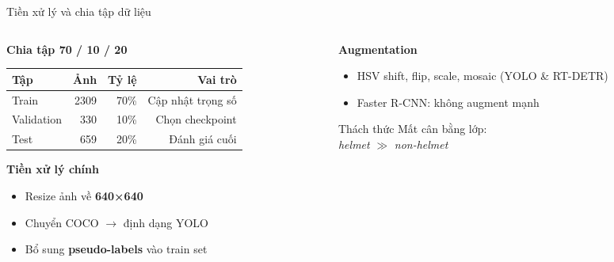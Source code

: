 \begin{frame}{Tiền xử lý và chia tập dữ liệu}

\begin{columns}[T]
\begin{column}{0.55\textwidth}
  \textbf{Chia tập 70 / 10 / 20}

  \vspace{0.3em}
  \begin{table}
  \scriptsize
  \begin{tabular}{lrrr}
    \toprule
    \textbf{Tập} & \textbf{Ảnh} & \textbf{Tỷ lệ} & \textbf{Vai trò} \\
    \midrule
    Train      & 2309 & 70\% & Cập nhật trọng số \\
    Validation & 330  & 10\% & Chọn checkpoint  \\
    Test       & 659  & 20\% & Đánh giá cuối    \\
    \bottomrule
  \end{tabular}
  \end{table}

  \vspace{0.4em}
  \textbf{Tiền xử lý chính}
  \begin{itemize}
    \item Resize ảnh về \textbf{640×640}
    \item Chuyển COCO $\to$ định dạng YOLO
    \item Bổ sung \textbf{pseudo-labels} vào train set
  \end{itemize}
\end{column}
\begin{column}{0.42\textwidth}
  \textbf{Augmentation}
  \begin{itemize}
    \item HSV shift, flip, scale, mosaic (YOLO \& RT-DETR)
    \item Faster R-CNN: không augment mạnh
  \end{itemize}
  \vspace{0.4em}
  \begin{alertblock}{Thách thức}
    Mất cân bằng lớp:\\
    \textit{helmet} $\gg$ \textit{non-helmet}
  \end{alertblock}
\end{column}
\end{columns}

\end{frame}

